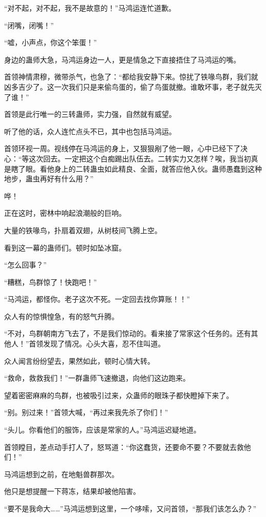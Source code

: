 \begin{this_body}
“对不起，对不起，我不是故意的！”马鸿运连忙道歉。

“闭嘴，闭嘴！”

“嘘，小声点，你这个笨蛋！”

身边的蛊师大急，马鸿运身边一人，更是情急之下直接捂住了马鸿运的嘴。

首领神情肃穆，微带杀气，也急了：“都给我安静下来。惊扰了铁喙鸟群，我们就凶多吉少了。这一次我们只是来偷鸟蛋的，偷了鸟蛋就撤。谁敢坏事，老子就先灭了谁！”

首领是此行唯一的三转蛊师，实力强，自然就有威望。

听了他的话，众人连忙点头不已，其中也包括马鸿运。

首领环视一周。视线停在马鸿运的身上，又狠狠剐了他一眼，心中已经下了决心：“等这次回去。一定把这个白痴踢出队伍去。二转实力又怎样？唉，我当初真是瞎了眼。看他身上的二转蛊虫如此精良、全面，就答应他入伙。蛊师愚蠢到这种地步，蛊虫再好有什么用？”

哗！

正在这时，密林中响起浪潮般的巨响。

大量的铁喙鸟，扑扇着双翅，从树枝间飞腾上空。

看到这一幕的蛊师们。顿时如坠冰窟。

“怎么回事？”

“糟糕，鸟群惊了！快跑吧！”

“马鸿运，都怪你。老子这次不死。一定回去找你算账！！”

众人有的惊惧惶急，有的怒气升腾。

“不对，鸟群朝南方飞去了，不是我们惊动的。看来接了常家这个任务的。还有其他人！”首领发现了情况。心头大喜，忍不住叫道。

众人闻言纷纷望去，果然如此，顿时心情大转。

“救命，救救我们！”一群蛊师飞速撤退，向他们这边跑来。

望着密密麻麻的鸟群，也被吸引过来，众蛊师的眼珠子都快瞪掉下来了。

“别。别过来！”首领大喊，“再过来我先杀了你们！”

“头儿。你看他们的服饰，应该是常家的人。”马鸿运迟疑地道。

首领瞠目，差点动手打人了，怒骂道：“你这蠢货，还要命不要？不要就去救他们！”

马鸿运想到之前，在地魁兽群那次。

他只是想提醒一下蒋冻，结果却被他陷害。

“要不是我命大……”马鸿运想到这里，一个哆嗦，又问首领，“那我们该怎么办？”


\end{this_body}

